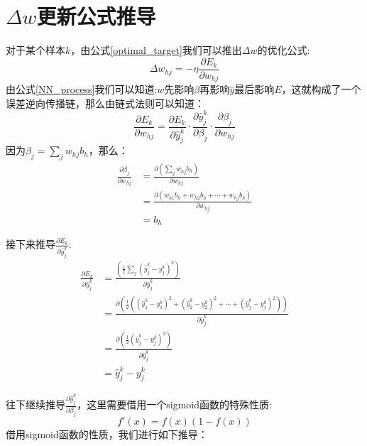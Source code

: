 \documentclass[11pt]{report}
\begin{document}
\section{$\Delta w$更新公式推导}
对于某个样本$k$，由公式\ref{optimal_target}我们可以推出$\Delta w$的优化公式:
\begin{equation}
	\Delta w_{hj}=-\eta\frac{\partial E_k}{\partial w_{hj}}
\end{equation}
由公式\ref{NN_process}我们可以知道:$w$先影响$\beta$再影响$\hat{y}$最后影响$E$，这就构成了一个误差逆向传播链，那么由链式法则可以知道：
\begin{equation}
\label{w_123}
	\frac{\partial E_k}{\partial w_{hj}}=\frac{\partial E_k}{\partial \hat{y}_j^k}\cdot\frac{\partial \hat{y}_j^k}{\partial \beta_j}\cdot\frac{\partial \beta_j}{\partial w_{hj}}
\end{equation}
因为$\beta_j=\sum_j w_{hj}b_h$，那么：
\begin{equation}
\label{w_3}
\begin{split}
	\frac{\partial \beta_j}{\partial w_{hj}}&=\frac{\partial\left(\sum_j w_{hj}b_h \right)}{\partial w_{hj}}\\
		&=\frac{\partial\left(w_{h1}b_h+w_{h2}b_h+\cdots+w_{hj}b_h \right)}{\partial w_{hj}}\\
		&=b_h
\end{split}	
\end{equation}
\par
接下来推导$\frac{\partial E_k}{\partial \hat{y}_j^k}$:
\begin{equation}
\label{w_1}
	\begin{split}
		\frac{\partial E_k}{\partial \hat{y}_j^k}&=\frac{\left(\frac{1}{2}\sum_j(\hat{y}_j^k-y_j^k)^2 \right)}{\partial \hat{y}_j^k}\\
		&=\frac{\partial\left(\frac{1}{2}\left((\hat{y}_1^k-y_1^k)^2+(\hat{y}_2^k-y_2^k)^2+\cdots+(\hat{y}_j^k-y_j^k)^2\right) \right)}{\partial \hat{y}_j^k}\\
		&=\frac{\partial\left(\frac{1}{2} (\hat{y}_j^k-y_j^k)^2\right)}{\partial \hat{y}_j^k}\\
		&=\hat{y}_j^k-y_j^k
	\end{split}
\end{equation}
\par
往下继续推导$\frac{\partial \hat{y}_j^k}{\partial \beta_j}$，这里需要借用一个sigmoid函数的特殊性质:
\begin{equation}
\label{sigmoid_xingzhi}
	f'(x)=f(x)(1-f(x))
\end{equation}
借用sigmoid函数的性质，我们进行如下推导：
\end{document}
